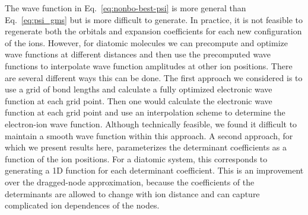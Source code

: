 The wave function in Eq.~\ref{eq:nonbo-best-psi} is more general than Eq.~\ref{eq:psi_gms}
but is more difficult to generate. In practice, it is not feasible to regenerate both the orbitals and expansion coefficients for each new configuration of the ions.
However, for diatomic molecules we can precompute and optimize wave functions at different distances and then use the precomputed wave functions to interpolate wave function amplitudes at other ion positions.
There are several different ways this can be done.
The first approach we considered is to use a grid of bond lengths and calculate a fully optimized electronic wave function at each grid point.
Then one would calculate the electronic wave function at each grid point and use an interpolation scheme to determine the electron-ion wave function.
Although technically feasible, we found it difficult to maintain a smooth wave function within this approach.
A second approach, for which we present results here, parameterizes the
determinant coefficients as a function of the ion positions.
For a diatomic system, this corresponds to generating a 1D function for each determinant coefficient.
This is an improvement over the dragged-node approximation, because the coefficients of the determinants are allowed to change with ion distance and can capture complicated ion dependences of the nodes.

